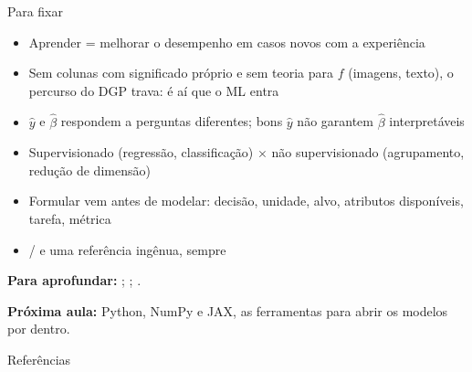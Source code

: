 \documentclass[aspectratio=169,11pt]{beamer}
\begin{document}
\begin{frame}{Para fixar}
  \begin{itemize}\small
    \item Aprender = melhorar o desempenho em \alert{casos novos} com a experiência
    \item Sem colunas com significado próprio e sem teoria para $f$ (imagens,
          texto), o percurso do DGP trava: é aí que o ML entra
    \item $\hat y$ e $\hat\beta$ respondem a perguntas diferentes; bons $\hat y$ não
          garantem $\hat\beta$ interpretáveis
    \item Supervisionado (regressão, classificação) $\times$ não supervisionado
          (agrupamento, redução de dimensão)
    \item Formular vem antes de modelar: decisão, unidade, alvo, atributos
          \alert{disponíveis}, tarefa, métrica
    \item {} /  e uma referência ingênua, sempre
  \end{itemize}
  \medskip
  \small\textbf{Para aprofundar:} \textcite{mullainathan2017}; \textcite[cap.~2]{james2021};
  \textcite{breiman2001cultures}.
  \smallskip

  \textbf{Próxima aula:} Python, NumPy e JAX, as ferramentas para abrir os modelos por dentro.
\end{frame}

\begin{frame}{Referências}
  \printbibliography[heading=none]
\end{frame}
\end{document}
